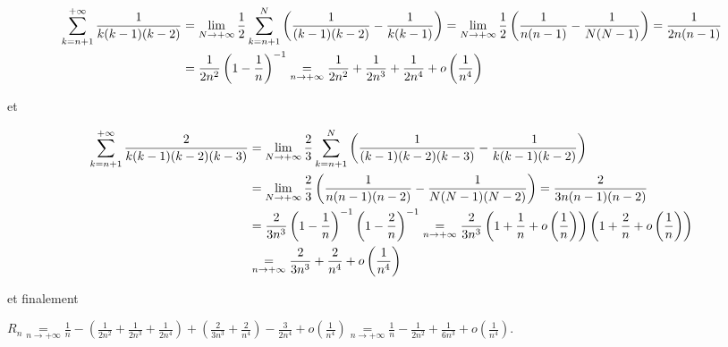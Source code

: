 {{\begin{align*}\ensuremath
\sum_{k=n+1}^{+\infty}\frac{1}{k(k-1)(k-2)}&=\lim_{N \rightarrow +\infty}\frac{1}{2}\sum_{k=n+1}^{N}\left(\frac{1}{(k-1)(k-2)}-\frac{1}{k(k-1)}\right)=\lim_{N \rightarrow +\infty}\frac{1}{2}\left(\frac{1}{n(n-1)}-\frac{1}{N(N-1)}\right)=\frac{1}{2n(n-1)}\\
 &=\frac{1}{2n^2}\left(1-\frac{1}{n}\right)^{-1}\underset{n\rightarrow+\infty}{=}\frac{1}{2n^2}+\frac{1}{2n^3}+\frac{1}{2n^4}+o\left(\frac{1}{n^4}\right)
\end{align*}

et

\begin{align*}\ensuremath
\sum_{k=n+1}^{+\infty}\frac{2}{k(k-1)(k-2)(k-3)}&=\lim_{N \rightarrow +\infty}\frac{2}{3}\sum_{k=n+1}^{N}\left(\frac{1}{(k-1)(k-2)(k-3)}-\frac{1}{k(k-1)(k-2)}\right)\\
 &=\lim_{N \rightarrow +\infty}\frac{2}{3}\left(\frac{1}{n(n-1)(n-2)}-\frac{1}{N(N-1)(N-2)}\right)=\frac{2}{3n(n-1)(n-2)}\\
 &=\frac{2}{3n^3}\left(1-\frac{1}{n}\right)^{-1}\left(1-\frac{2}{n}\right)^{-1}\underset{n\rightarrow+\infty}{=}\frac{2}{3n^3}\left(1+\frac{1}{n}+o\left(\frac{1}{n}\right)\right)\left(1+\frac{2}{n}+o\left(\frac{1}{n}\right)\right)\\
  &\underset{n\rightarrow+\infty}{=}\frac{2}{3n^3}+\frac{2}{n^4}+o\left(\frac{1}{n^4}\right)
\end{align*}

et finalement

\begin{center}
$R_n\underset{n\rightarrow+\infty}{=}\frac{1}{n}-\left(\frac{1}{2n^2}+\frac{1}{2n^3}+\frac{1}{2n^4}\right)+\left(\frac{2}{3n^3}+\frac{2}{n^4}\right)-\frac{3}{2n^4}+o\left(\frac{1}{n^4}\right)\underset{n\rightarrow+\infty}{=}\frac{1}{n}-\frac{1}{2n^2}+\frac{1}{6n^3}+o\left(\frac{1}{n^4}\right)$.
\end{center}

\begin{center}
\end{center}
}
}
